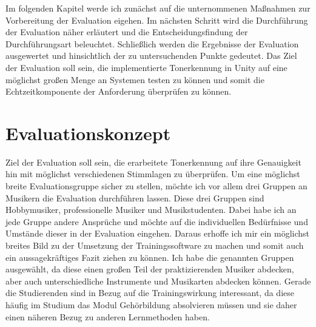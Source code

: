 Im folgenden Kapitel werde ich zunächst auf die unternommenen Maßnahmen zur Vorbereitung der Evaluation eigehen. Im nächsten Schritt wird die Durchführung der Evaluation näher erläutert und die Entscheidungsfindung der Durchführungsart beleuchtet. Schließlich werden die Ergebnisse der Evaluation ausgewertet und hinsichtlich der zu untersuchenden Punkte gedeutet.  Das Ziel der Evaluation soll sein, die implementierte Tonerkennung in Unity auf eine möglichst großen Menge an Systemen testen zu können und somit die Echtzeitkomponente der Anforderung überprüfen zu können. 
\section{Evaluationskonzept}
Ziel der Evaluation soll sein, die erarbeitete Tonerkennung auf ihre Genauigkeit hin mit möglichst verschiedenen Stimmlagen zu überprüfen. Um eine möglichst breite Evaluationsgruppe sicher zu stellen, möchte ich vor allem drei Gruppen an Musikern die Evaluation durchführen lassen. Diese drei Gruppen sind Hobbymusiker, professionelle Musiker und Musikstudenten. Dabei habe ich an jede Gruppe andere Ansprüche und möchte auf die individuellen Bedürfnisse und Umstände dieser in der Evaluation eingehen. Daraus erhoffe ich mir ein möglichst breites Bild zu der Umsetzung der Trainingssoftware zu machen und somit auch ein aussagekräftiges Fazit ziehen zu können.
Ich habe die genannten Gruppen ausgewählt, da diese einen großen Teil der praktizierenden Musiker abdecken, aber auch unterschiedliche Instrumente und Musikarten abdecken können. Gerade die Studierenden sind in Bezug auf die Trainingswirkung interessant, da diese häufig im Studium das Modul Gehörbildung absolvieren müssen und sie daher einen näheren Bezug zu anderen Lernmethoden haben. \\
